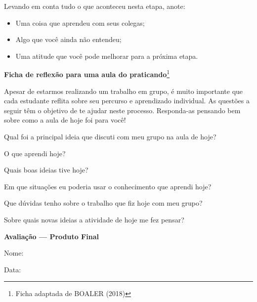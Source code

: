 Levando em conta tudo o que aconteceu nesta etapa, anote:
\begin{itemize}[itemsep=4em]
\item Uma coisa que aprendeu com seus colegas;
\item Algo que você ainda não entendeu;
\item Uma atitude que você pode melhorar para a próxima etapa.
\end{itemize}
\cleardoublepage

\centering
\textbf{\Large\color{\currentcolor} Ficha de reflexão para uma aula do praticando}\footnote{Ficha adaptada de BOALER (2018)}
\justify

Apesar de estarmos realizando um trabalho em grupo, é muito importante que cada estudante reflita sobre seu percurso e aprendizado individual. As questões a seguir têm o objetivo de te ajudar neste processo. Responda-as pensando bem sobre como a aula de hoje foi para você!

{\noindent Qual foi a principal ideia que discuti com meu grupo na aula de hoje?
\setlength\parskip{6em}

\noindent O que aprendi hoje?

\noindent Quais boas ideias tive hoje?

\noindent Em que situações eu poderia usar o conhecimento que aprendi hoje?

\noindent Que dúvidas tenho sobre o trabalho que fiz hoje com meu grupo?

\noindent Sobre quais novas ideias a atividade de hoje me fez pensar?
}

\cleardoublepage

\centering
\textbf{\Large\color{\currentcolor} Avaliação --- Produto Final}
\vspace{3em}

\flushleft
Nome:\makebox[20em]{\hrulefill}

Data:\makebox[10em]{\hrulefill}

\vspace{5em}
\justify
\begin{figure}[H]
\centering

\end{figure}


